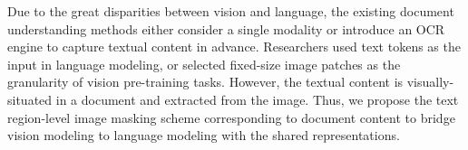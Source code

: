 \documentclass{article} %
\begin{document}
 Due to the great disparities between vision and language, the existing document understanding methods either consider a single modality or introduce an OCR engine to capture textual content in advance. Researchers used text tokens as the input in language modeling, or selected fixed-size image patches as the granularity of vision pre-training tasks. However, the textual content is visually-situated in a document and extracted from the image. Thus, we propose the text region-level image masking scheme corresponding to document content to bridge vision modeling to language modeling with the shared representations.



\end{document}
